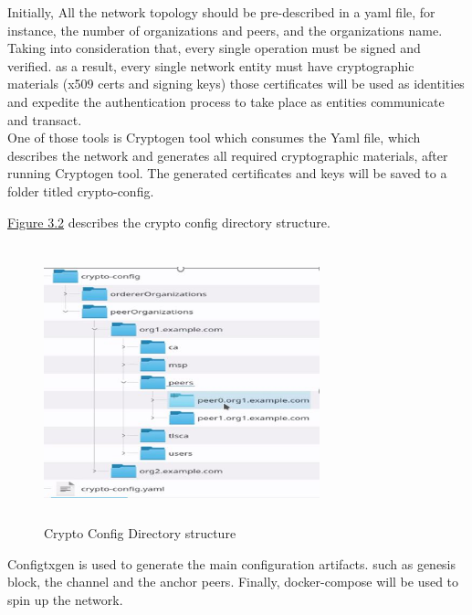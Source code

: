 Initially, All the network topology should be pre-described in a yaml file, for instance, the number of organizations and peers, and the organizations name.\\
Taking into consideration that, every single operation must be signed and verified. as a result, every single network entity must have cryptographic materials (x509 certs and signing keys) those certificates will be used as identities and expedite the authentication process to take place as entities communicate and transact.  \\ 
One of those tools is Cryptogen tool which consumes the Yaml file, which describes the network and generates all required cryptographic materials, after running Cryptogen tool. The generated certificates and keys will be saved to a folder titled crypto-config.

\clearpage 

\noindent \hyperref[fig:cryptoconfig]{Figure 3.2} describes the crypto config directory structure.  
 \begin{figure}[H]
\center
\includegraphics[width=8cm,height=8cm]{images/cryptoconfig.jpg}
\caption{Crypto Config Directory structure}
\label{fig:cryptoconfig}
\end{figure}


\noindent Configtxgen is used to generate the main configuration artifacts. such as genesis block, the channel and the anchor peers. 
Finally, docker-compose will be used to spin up the network. 

